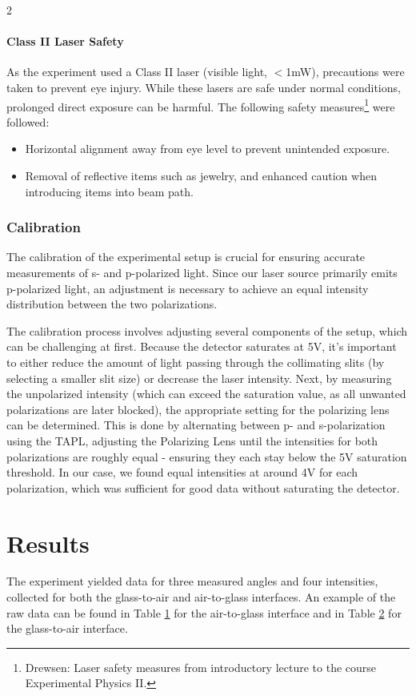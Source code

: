 \documentclass[a4paper,oneside,article]{memoir}
\begin{document}
\begin{multicols}{2}
\subsubsection{Class II Laser Safety}
As the experiment used a Class II laser (visible light, $<$1mW), precautions were taken to prevent eye injury. While these lasers are safe under normal conditions, prolonged direct exposure can be harmful. The following safety measures\footnote{Drewsen: Laser safety measures from introductory lecture to the course Experimental Physics II.} were followed:
\begin{itemize}
    \item Horizontal alignment away from eye level to prevent unintended exposure.
    \item Removal of reflective items such as jewelry, and enhanced caution when introducing items into beam path.
\end{itemize}

\subsection{Calibration} \label{sec:cal}
The calibration of the experimental setup is crucial for ensuring accurate measurements of s- and p-polarized light. Since our laser source primarily emits p-polarized light, an adjustment is necessary to achieve an equal intensity distribution between the two polarizations.

The calibration process involves adjusting several components of the setup, which can be challenging at first. Because the detector saturates at 5V, it's important to either reduce the amount of light passing through the collimating slits (by selecting a smaller slit size) or decrease the laser intensity. Next, by measuring the unpolarized intensity (which can exceed the saturation value, as all unwanted polarizations are later blocked), the appropriate setting for the polarizing lens can be determined. This is done by alternating between p- and s-polarization using the TAPL, adjusting the Polarizing Lens until the intensities for both polarizations are roughly equal - ensuring they each stay below the 5V saturation threshold. In our case, we found equal intensities at around 4V for each polarization, which was sufficient for good data without saturating the detector.

\chapter{Results}
The experiment yielded data for three measured angles and four intensities, collected for both the glass-to-air and air-to-glass interfaces. An example of the raw data can be found in Table \hyperref[tab:data1]{1} for the air-to-glass interface and in Table \hyperref[tab:data2]{2} for the glass-to-air interface.


\end{multicols}
\end{document}
